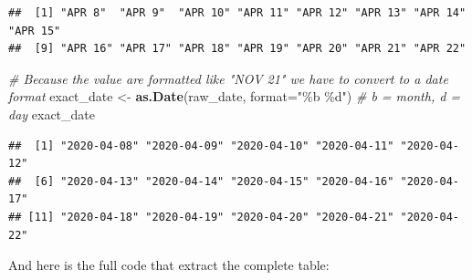 \documentclass[
]{book}
\newenvironment{Shaded}{\begin{snugshade}}{\end{snugshade}}
\newcommand{\CommentTok}[1]{\textcolor[rgb]{0.56,0.35,0.01}{\textit{#1}}}
\newcommand{\DataTypeTok}[1]{\textcolor[rgb]{0.13,0.29,0.53}{#1}}
\newcommand{\KeywordTok}[1]{\textcolor[rgb]{0.13,0.29,0.53}{\textbf{#1}}}
\newcommand{\NormalTok}[1]{#1}
\newcommand{\StringTok}[1]{\textcolor[rgb]{0.31,0.60,0.02}{#1}}
\begin{document}
\begin{verbatim}
##  [1] "APR 8"  "APR 9"  "APR 10" "APR 11" "APR 12" "APR 13" "APR 14" "APR 15"
##  [9] "APR 16" "APR 17" "APR 18" "APR 19" "APR 20" "APR 21" "APR 22"
\end{verbatim}

\begin{Shaded}
\begin{Highlighting}[]
\CommentTok{\# Because the value are formatted like "NOV 21" we have to convert to a date format}
\NormalTok{exact\_date \textless{}{-}}\StringTok{ }\KeywordTok{as.Date}\NormalTok{(raw\_date, }\DataTypeTok{format=}\StringTok{"\%b \%d"}\NormalTok{) }\CommentTok{\# b = month, d = day}
\NormalTok{exact\_date}
\end{Highlighting}
\end{Shaded}

\begin{verbatim}
##  [1] "2020-04-08" "2020-04-09" "2020-04-10" "2020-04-11" "2020-04-12"
##  [6] "2020-04-13" "2020-04-14" "2020-04-15" "2020-04-16" "2020-04-17"
## [11] "2020-04-18" "2020-04-19" "2020-04-20" "2020-04-21" "2020-04-22"
\end{verbatim}

And here is the full code that extract the complete table:
\end{document}
